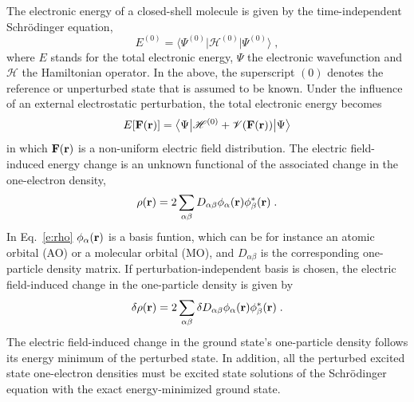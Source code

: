 \documentclass[aip,amsmath,amssymb,reprint,floatfix]{revtex4-1}
\newcommand{\tbraket}[3]{\ensuremath{\bigl\langle {#1} \bigl\lvert {#2} \bigl\lvert {#3} \bigr\rangle}}
\begin{document}
The electronic energy of a closed\hyp{}shell molecule is given by the time\hyp{}independent Schr{\"o}dinger equation,
%
\begin{equation}
 E^{(0)} = \tbraket{\Psi^{(0)}}{\mathscr{H}^{(0)}}{\Psi^{(0)}} \;,
\end{equation}
%
where $E$ stands for the total electronic energy, $\Psi$ the electronic wavefunction and $\mathscr{H}$
the Hamiltonian operator. In the above, the superscript $(0)$
denotes the reference or unperturbed state that is assumed to be known.
Under the influence of an external electrostatic perturbation, the total electronic energy
becomes
%
\begin{equation}
 E[{\bf F}({\bf r})] = \tbraket{\Psi}{\mathscr{H}^{(0)} + \mathscr{V}({\bf F}({\bf r}))}{\Psi}
\end{equation}
%
in which ${\bf F}({\bf r})$ is a non\hyp{}uniform electric field distribution.
The electric field\hyp{}induced energy change is an unknown functional 
of the associated change in the one\hyp{}electron density,
%
\begin{equation}\label{e:rho}
 \rho({\bf r}) = 2\sum_{\alpha\beta} D_{\alpha\beta} \phi_\alpha({\bf r}) \phi^*_\beta({\bf r}) \;.
\end{equation}
%
In Eq.~\eqref{e:rho} $\phi_\alpha({\bf r})$ is a basis funtion, which can be for instance 
an atomic orbital (AO) or a molecular orbital (MO), and $D_{\alpha\beta}$ is the corresponding
one\hyp{}particle density matrix.
If perturbation\hyp{}independent basis is chosen, the electric field\hyp{}induced change in the one\hyp{}particle density
is given by
%
\begin{equation}\label{e:rho-1}
 \delta \rho({\bf r}) = 2\sum_{\alpha\beta} \delta D_{\alpha\beta} \phi_\alpha({\bf r}) \phi^*_\beta({\bf r}) \;.
\end{equation}
%
The electric field\hyp{}induced change in the ground state's one\hyp{}particle density 
follows its energy minimum of the perturbed state. In addition, all the perturbed 
excited state one\hyp{}electron densities must be excited state solutions of the Schr{\"o}dinger equation
with the exact energy\hyp{}minimized ground state. 
\end{document}
